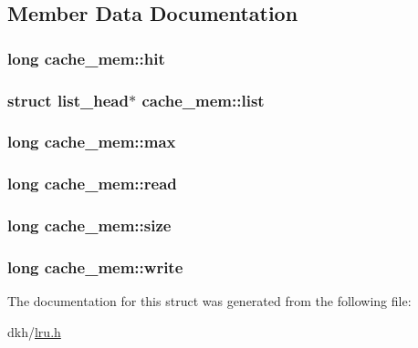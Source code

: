 \subsection{Member Data Documentation}
\hypertarget{structcache__mem_a2b8742701cf4beaff0639d36d52209d9}{
\subsubsection[{hit}]{\setlength{\rightskip}{0pt plus 5cm}long cache\+\_\+mem\+::hit}}\label{structcache__mem_a2b8742701cf4beaff0639d36d52209d9}
\hypertarget{structcache__mem_a785dde86afb87f8825779f50e29d6bd7}{
\subsubsection[{list}]{\setlength{\rightskip}{0pt plus 5cm}struct {\bf list\+\_\+head}$\ast$ cache\+\_\+mem\+::list}}\label{structcache__mem_a785dde86afb87f8825779f50e29d6bd7}
\hypertarget{structcache__mem_aca41dfab3073387e6c6063457a17f616}{
\subsubsection[{max}]{\setlength{\rightskip}{0pt plus 5cm}long cache\+\_\+mem\+::max}}\label{structcache__mem_aca41dfab3073387e6c6063457a17f616}
\hypertarget{structcache__mem_af64061b621392a1872f5cb92dde7dc7c}{
\subsubsection[{read}]{\setlength{\rightskip}{0pt plus 5cm}long cache\+\_\+mem\+::read}}\label{structcache__mem_af64061b621392a1872f5cb92dde7dc7c}
\hypertarget{structcache__mem_a58c6a91c40d59398a3ed18daccc448fc}{
\subsubsection[{size}]{\setlength{\rightskip}{0pt plus 5cm}long cache\+\_\+mem\+::size}}\label{structcache__mem_a58c6a91c40d59398a3ed18daccc448fc}
\hypertarget{structcache__mem_adb5a0315176779908235c7ed3e41ec57}{
\subsubsection[{write}]{\setlength{\rightskip}{0pt plus 5cm}long cache\+\_\+mem\+::write}}\label{structcache__mem_adb5a0315176779908235c7ed3e41ec57}


The documentation for this struct was generated from the following file\+:\begin{DoxyCompactItemize}
\item 
dkh/\hyperlink{lru_8h}{lru.\+h}\end{DoxyCompactItemize}
